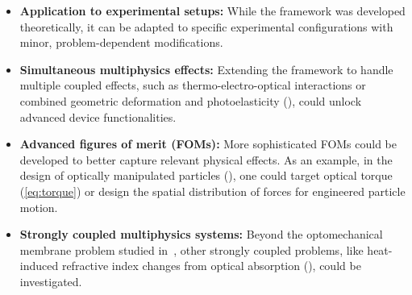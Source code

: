 \begin{itemize}
    \item \textbf{Application to experimental setups:} While the framework was developed theoretically, it can be adapted to specific experimental configurations with minor, problem-dependent modifications.
    
    
    \item \textbf{Simultaneous multiphysics effects:} Extending the framework to handle multiple coupled effects, such as thermo-electro-optical interactions or combined geometric deformation and photoelasticity (), could unlock advanced device functionalities.
    
    \item \textbf{Advanced figures of merit (FOMs):} More sophisticated FOMs could be developed to better capture relevant physical effects. As an example, in the design of optically manipulated particles (), one could target optical torque (\eqref{eq:torque}) or design the spatial distribution of forces for engineered particle motion.
    
    \item \textbf{Strongly coupled multiphysics systems:} Beyond the optomechanical membrane problem studied in~, other strongly coupled problems, like heat-induced refractive index changes from optical absorption (), could be investigated.
    
\end{itemize}
